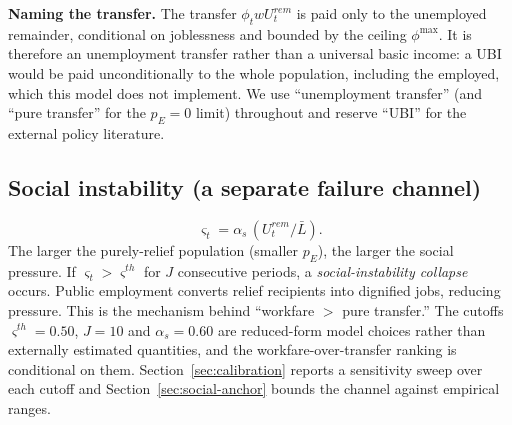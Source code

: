 \documentclass[review,12pt]{elsarticle}
\theoremstyle{plain}
\theoremstyle{definition}
\theoremstyle{remark}
\newcommand{\barL}{\bar{L}}
\begin{document}
\smallskip\noindent\textbf{Naming the transfer.} The transfer $\phi_t w U_t^{rem}$ is paid only to the unemployed remainder, conditional on joblessness and bounded by the ceiling $\phi^{\max}$. It is therefore an unemployment transfer rather than a universal basic income: a UBI would be paid unconditionally to the whole population, including the employed, which this model does not implement. We use ``unemployment transfer'' (and ``pure transfer'' for the $p_E=0$ limit) throughout and reserve ``UBI'' for the external policy literature.

\subsection{Social instability (a separate failure channel)}
\label{sec:social-instability}
\begin{equation}
\varsigma_t=\alpha_s\,(U_t^{rem}/\barL).
\end{equation}
The larger the purely-relief population (smaller $p_E$), the larger the social pressure. If $\varsigma_t>\varsigma^{th}$ for $J$ consecutive periods, a \emph{social-instability collapse} occurs. Public employment converts relief recipients into dignified jobs, reducing pressure. This is the mechanism behind ``workfare $>$ pure transfer.'' The cutoffs $\varsigma^{th}=0.50$, $J=10$ and $\alpha_s=0.60$ are reduced-form model choices rather than externally estimated quantities, and the workfare-over-transfer ranking is conditional on them. Section~\ref{sec:calibration} reports a sensitivity sweep over each cutoff and Section~\ref{sec:social-anchor} bounds the channel against empirical ranges.
\end{document}
